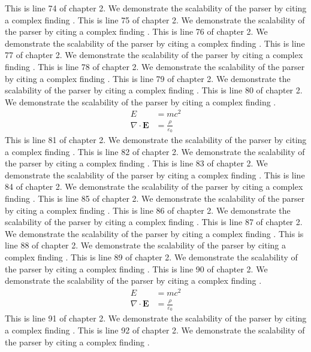 This is line 74 of chapter 2. We demonstrate the scalability of the parser by citing a complex finding \cite{ref2_74}.
This is line 75 of chapter 2. We demonstrate the scalability of the parser by citing a complex finding \cite{ref2_75}.
This is line 76 of chapter 2. We demonstrate the scalability of the parser by citing a complex finding \cite{ref2_76}.
This is line 77 of chapter 2. We demonstrate the scalability of the parser by citing a complex finding \cite{ref2_77}.
This is line 78 of chapter 2. We demonstrate the scalability of the parser by citing a complex finding \cite{ref2_78}.
This is line 79 of chapter 2. We demonstrate the scalability of the parser by citing a complex finding \cite{ref2_79}.
This is line 80 of chapter 2. We demonstrate the scalability of the parser by citing a complex finding \cite{ref2_80}.
\begin{align*}
  E &= mc^2 \\
  \nabla \cdot \mathbf{E} &= \frac{\rho}{\varepsilon_0}
\end{align*}
This is line 81 of chapter 2. We demonstrate the scalability of the parser by citing a complex finding \cite{ref2_81}.
This is line 82 of chapter 2. We demonstrate the scalability of the parser by citing a complex finding \cite{ref2_82}.
This is line 83 of chapter 2. We demonstrate the scalability of the parser by citing a complex finding \cite{ref2_83}.
This is line 84 of chapter 2. We demonstrate the scalability of the parser by citing a complex finding \cite{ref2_84}.
This is line 85 of chapter 2. We demonstrate the scalability of the parser by citing a complex finding \cite{ref2_85}.
This is line 86 of chapter 2. We demonstrate the scalability of the parser by citing a complex finding \cite{ref2_86}.
This is line 87 of chapter 2. We demonstrate the scalability of the parser by citing a complex finding \cite{ref2_87}.
This is line 88 of chapter 2. We demonstrate the scalability of the parser by citing a complex finding \cite{ref2_88}.
This is line 89 of chapter 2. We demonstrate the scalability of the parser by citing a complex finding \cite{ref2_89}.
This is line 90 of chapter 2. We demonstrate the scalability of the parser by citing a complex finding \cite{ref2_90}.
\begin{align*}
  E &= mc^2 \\
  \nabla \cdot \mathbf{E} &= \frac{\rho}{\varepsilon_0}
\end{align*}
This is line 91 of chapter 2. We demonstrate the scalability of the parser by citing a complex finding \cite{ref2_91}.
This is line 92 of chapter 2. We demonstrate the scalability of the parser by citing a complex finding \cite{ref2_92}.
